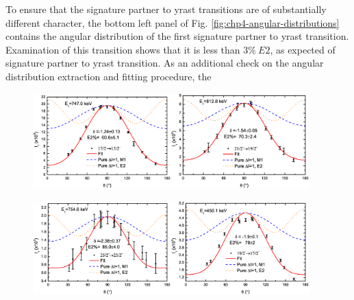 To ensure that the signature partner to yrast transitions are of substantially different character, the bottom left panel of Fig. \ref{fig:chp4-angular-distributions} contains the angular distribution of the first signature partner to yrast transition. Examination of this transition shows that it is less than $3\%~E2$, as expected of signature partner to yrast transition. As an additional check on the angular distribution extraction and fitting procedure, the
\begin{figure}[t!]
\centerline{\includegraphics[width=0.475\textwidth]{./img/c4/747Dist_Plot.eps}\hspace{0.04\textwidth}\includegraphics[width=0.475\textwidth]{./img/c4/813Dist_Plot.eps}}
\centerline{\includegraphics[width=0.475\textwidth]{./img/c4/755Dist_Plot.eps}\hspace{0.04\textwidth}\includegraphics[width=0.475\textwidth]{./img/c4/450Dist_Plot.eps}}

\end{figure}
